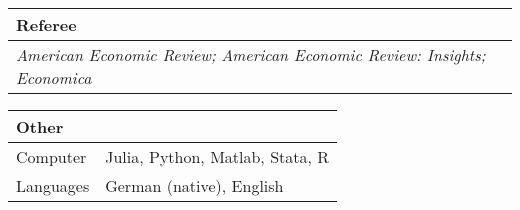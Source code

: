 \documentclass{article}
\numberwithin{equation}{section}
\begin{document}
\clearpage
\begin{table}[ht!]
	\normalsize
	\begin{tabular}{p{\textwidth}}
		\textbf{Referee} \\ \midrule
		\textit{American Economic Review;} \textit{American Economic Review: Insights;} \textit{Economica}
	\end{tabular}

	\vspace{5mm}

	\begin{tabular}{p{}p{}}
		\textbf{Other}   &                                 \\ \midrule
		\qquad Computer  & Julia, Python, Matlab, Stata, R \\
		\qquad Languages & German (native), English
	\end{tabular}
\end{table}
\end{document}
